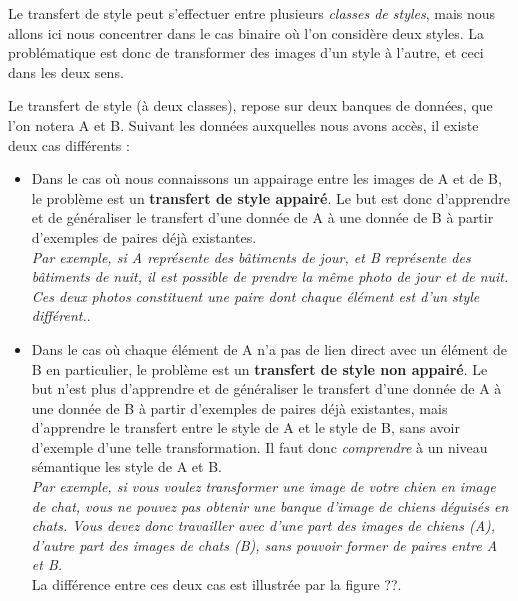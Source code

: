 Le transfert de style peut s'effectuer entre plusieurs \textit{classes de styles}, mais nous allons ici nous concentrer dans le cas binaire où l'on considère deux styles. La problématique est donc de transformer des images d'un style à l'autre, et ceci dans les deux sens.

Le transfert de style (à deux classes), repose sur deux banques de données, que l'on notera A et B. Suivant les données auxquelles nous avons accès, il existe deux cas différents :
\begin{itemize}
  \item Dans le cas où nous connaissons un appairage entre les images de A et de B, le problème est un \textbf{transfert de style appairé}. Le but est donc d'apprendre et de généraliser le transfert d'une donnée de A à une donnée de B à partir d'exemples de paires déjà existantes.\\
  \textit{Par exemple, si A représente des bâtiments de jour, et B représente des bâtiments de nuit, il est possible de prendre la même photo de jour et de nuit. Ces deux photos constituent une paire dont chaque élément est d'un style différent.}.
  \item Dans le cas où chaque élément de A n'a pas de lien direct avec un élément de B en particulier, le problème est un \textbf{transfert de style non appairé}. Le but n'est plus d'apprendre et de généraliser le transfert d'une donnée de A à une donnée de B à partir d'exemples de paires déjà existantes, mais d'apprendre le transfert entre le style de A et le style de B, sans avoir d'exemple d'une telle transformation. Il faut donc \textit{comprendre} à un niveau sémantique les style de A et B.\\
  \textit{Par exemple, si vous voulez transformer une image de votre chien en image de chat, vous ne pouvez pas obtenir une banque d'image de chiens déguisés en chats. Vous devez donc travailler avec d'une part des images de chiens (A), d'autre part des images de chats (B), sans pouvoir former de paires entre A et B.}\\
   La différence entre ces deux cas est illustrée par la figure ??. 
\end{itemize}

